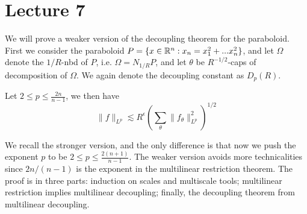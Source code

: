 \section*{Lecture 7}
We will prove a weaker version of the decoupling theorem for the paraboloid. First we consider the paraboloid $P=\{x\in\mathbb{R}^n:x_n=x_1^2+...x_n^2\}$, and let $\Omega$ denote the $1/R$-nbd of $P$, i.e. $\Omega=N_{1/R}P$, and let $\theta$ be $R^{-1/2}$-caps of decomposition of $\Omega$. We again denote the decoupling constant as $D_p(R)$. 
\begin{theorem}
    Let $2\leq p\leq\frac{2n}{n-1}$, we then have
    \begin{equation*}
        \|f\|_{L^p}\lesssim R^\epsilon\left(\sum_\theta\|f_\theta\|_{L^p}^2 \right)^{1/2}
    \end{equation*}
\end{theorem}
We recall the stronger version, and the only difference is that now we push the exponent $p$ to be $2\leq p\leq\frac{2(n+1)}{n-1}$. The weaker version avoids more technicalities since $2n/(n-1)$ is the exponent in the multilinear restriction theorem. The proof is in three parts: induction on scales and multiscale tools; multilinear restriction implies multilinear decoupling; finally, the decoupling theorem from multilinear decoupling.

